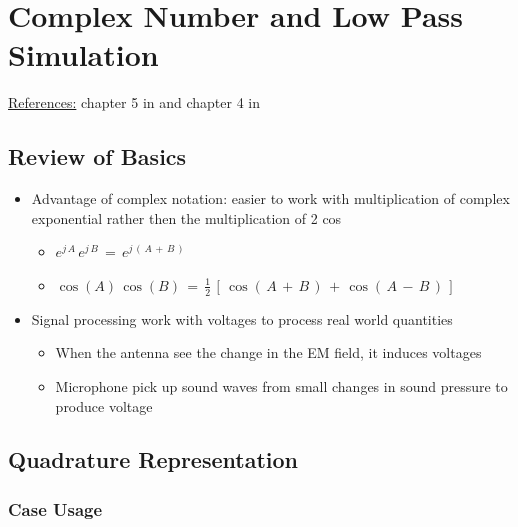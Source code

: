 

\chapter{Complex Number and Low Pass Simulation}

\underline{References:} chapter 5 in \cite{book_SDR_BobStewart} and chapter 4 in \cite{book_comm_system_sim_Tranter}

\section{Review of Basics}

\begin{itemize}

\item Advantage of complex notation: easier to work with multiplication of complex exponential rather then the multiplication of 2 cos

    \begin{itemize}
        \item $e^{j \, A} \, e^{j \, B} \, = \, e^{j \, (\, A \, + \, B \, )}$
        
        \item $\cos(A) \, \cos(B) \, = \, \displaystyle\frac{1}{2} \, \left[\, \cos( \, A \, + \, B \, ) \, + \, \cos( \, A \, - \, B \, )    \, \right]$
    \end{itemize}

\item Signal processing work with voltages to process real world quantities

\begin{itemize}
    \item When the antenna see the change in the EM field, it induces voltages
    
    \item Microphone pick up sound waves from small changes in sound pressure to produce voltage
\end{itemize}


\end{itemize}


\newpage
\section{Quadrature Representation}


\subsection{Case Usage}

